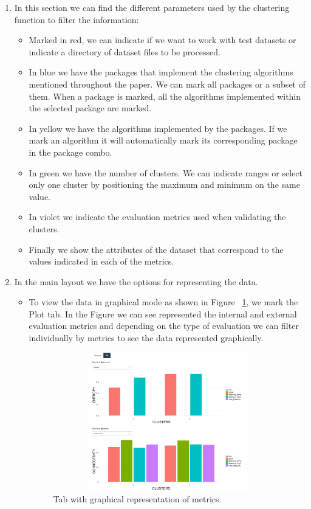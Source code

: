\begin{enumerate}
  \item In this section we can find the different parameters used by the clustering function to filter the information:
  \begin{itemize}
  \item Marked in red, we can indicate if we want to work with test datasets or indicate a directory of dataset files to be processed.
  \item In blue we have the packages that implement the clustering algorithms mentioned throughout the paper. We can mark all packages or a subset of them. When a package is marked, all the algorithms implemented within the selected package are marked.
  \item In yellow we have the algorithms implemented by the packages. If we mark an algorithm it will automatically mark its corresponding package in the package combo.
  \item In green we have the number of clusters. We can indicate ranges or select only one cluster by positioning the maximum and minimum on the same value.
  \item In violet we indicate the evaluation metrics used when validating the clusters.
  \item Finally we show the attributes of the dataset that correspond to the values indicated in each of the metrics.
\end{itemize}
  \item In the main layout we have the options for representing the data.
  \begin{itemize}

    \item To view the data in graphical mode as shown in Figure ~\ref{fig:tab_graph}, we mark the Plot tab. In the Figure we can see represented the internal and external evaluation metrics and depending on the type of evaluation we can filter individually by metrics to see the data represented graphically.


  \begin{figure}[htbp]
    \centering
     \includegraphics[width=10cm, height=6cm]{img/tab_graph}
      \caption{Tab with graphical representation of metrics.}
      \label{fig:tab_graph}
  \end{figure}


\end{itemize}
\end{enumerate}
